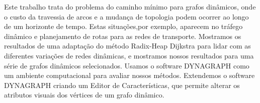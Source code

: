 Este trabalho trata do problema do caminho mínimo para grafos dinâmicos,
onde o custo da travessia de arcos e a mudança de topologia podem ocorrer ao
longo de um horizonte de tempo. Estas situações,por exemplo, aparecem no tráfego dinâmico
e planejamento de rotas para as redes de transporte.
Mostramos os resultados de uma adaptação do método Radix-Heap Dijkstra
para lidar com as diferentes variações de redes dinâmicas, e mostramos nossos resultados
para uma série de grafos dinâmicos selecionados. Usamos o software DYNAGRAPH como um ambiente
computacional para avaliar nossos métodos.
Extendemos o software DYNAGRAPH criando um Editor de Características, que permite
alterar os atributos visuais dos vértices de um grafo dinâmico.

